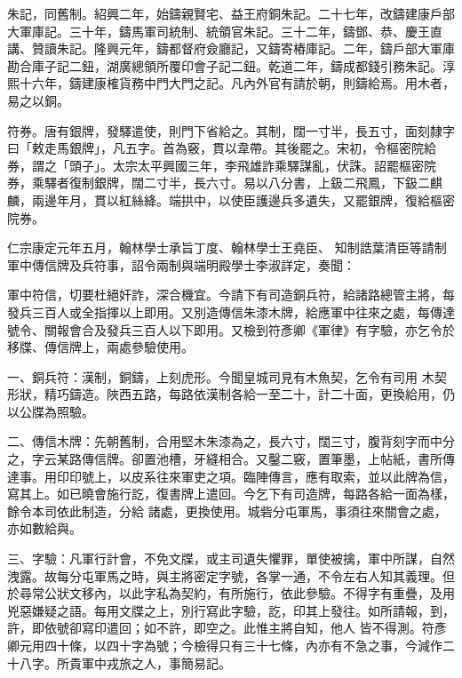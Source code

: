 \begin{pinyinscope}
 朱記，同舊制。紹興二年，始鑄親賢宅、益王府銅朱記。二十七年，改鑄建康戶部大軍庫記。三十年，鑄馬軍司統制、統領官朱記。三十二年，鑄鄧、恭、慶王直講、贊讀朱記。隆興元年，鑄都督府僉廳記，又鑄寄樁庫記。二年，鑄戶部大軍庫勘合庫子記二鈕，湖廣總領所覆印會子記二鈕。乾道二年，鑄成都錢引務朱記。淳熙十六年，鑄建康榷貨務中門大門之記。凡內外官有請於朝，則鑄給焉。用木者，易之以銅。



 符券。唐有銀牌，發驛遣使，則門下省給之。其制，闊一寸半，長五寸，面刻隸字曰「敕走馬銀牌」，凡五字。首為竅，貫以韋帶。其後罷之。宋初，令樞密院給券，謂之「頭子」。太宗太平興國三年，李飛雄詐乘驛謀亂，伏誅。詔罷樞密院券，乘驛者復制銀牌，闊二寸半，長六寸。易以八分書，上鈒二飛鳳，下鈒二麒麟，兩邊年月，貫以紅絲絳。端拱中，以使臣護邊兵多遺失，又罷銀牌，復給樞密院券。



 仁宗康定元年五月，翰林學士承旨丁度、翰林學士王堯臣、
 知制誥葉清臣等請制軍中傳信牌及兵符事，詔令兩制與端明殿學士李淑詳定，奏聞：



 軍中符信，切要杜絕奸詐，深合機宜。今請下有司造銅兵符，給諸路總管主將，每發兵三百人或全指揮以上即用。又別造傳信朱漆木牌，給應軍中往來之處，每傳達號令、關報會合及發兵三百人以下即用。又檢到符彥卿《軍律》有字驗，亦乞令於移牒、傳信牌上，兩處參驗使用。



 一、銅兵符：漢制，銅鑄，上刻虎形。今聞皇城司見有木魚契，乞令有司用
 木契形狀，精巧鑄造。陜西五路，每路依漢制各給一至二十，計二十面，更換給用，仍以公牒為照驗。



 二、傳信木牌：先朝舊制，合用堅木朱漆為之，長六寸，闊三寸，腹背刻字而中分之，字云某路傳信牌。卻置池槽，牙縫相合。又鑿二竅，置筆墨，上帖紙，書所傳達事。用印印號上，以皮系往來軍吏之項。臨陣傳言，應有取索，並以此牌為信，寫其上。如已曉會施行訖，復書牌上遣回。今乞下有司造牌，每路各給一面為樣，餘令本司依此制造，分給
 諸處，更換使用。城砦分屯軍馬，事須往來關會之處，亦如數給與。



 三、字驗：凡軍行計會，不免文牒，或主司遺失懼罪，單使被擒，軍中所謀，自然洩露。故每分屯軍馬之時，與主將密定字號，各掌一通，不令左右人知其義理。但於尋常公狀文移內，以此字私為契約，有所施行，依此參驗。不得字有重疊，及用兇惡嫌疑之語。每用文牒之上，別行寫此字驗，訖，印其上發往。如所請報，到，許，即依號卻寫印遣回；如不許，即空之。此惟主將自知，他人
 皆不得測。符彥卿元用四十條，以四十字為號；今檢得只有三十七條，內亦有不急之事，今減作二十八字。所貴軍中戎旅之人，事簡易記。




\end{pinyinscope}
